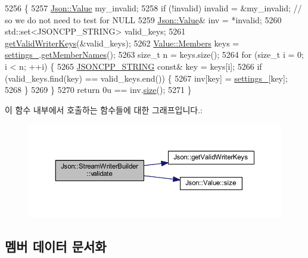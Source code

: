 \begin{DoxyCode}
5256 \{
5257   \hyperlink{class_json_1_1_value}{Json::Value} my\_invalid;
5258   \textcolor{keywordflow}{if} (!invalid) invalid = &my\_invalid;  \textcolor{comment}{// so we do not need to test for NULL}
5259   \hyperlink{class_json_1_1_value}{Json::Value}& inv = *invalid;
5260   std::set<JSONCPP\_STRING> valid\_keys;
5261   \hyperlink{namespace_json_a77ffcc6bb405332d84c260d304d4384e}{getValidWriterKeys}(&valid\_keys);
5262   \hyperlink{class_json_1_1_value_a9ae9069983fc38f1928d76f9c79ac64d}{Value::Members} keys = \hyperlink{class_json_1_1_stream_writer_builder_a79bdf2e639a52f4e758c0b95bd1d3423}{settings\_}.\hyperlink{class_json_1_1_value_a79d7725dce6260317333e69022367ac9}{getMemberNames}();
5263   \textcolor{keywordtype}{size\_t} n = keys.size();
5264   \textcolor{keywordflow}{for} (\textcolor{keywordtype}{size\_t} i = 0; i < n; ++i) \{
5265     \hyperlink{json-forwards_8h_a1e723f95759de062585bc4a8fd3fa4be}{JSONCPP\_STRING} \textcolor{keyword}{const}& key = keys[i];
5266     \textcolor{keywordflow}{if} (valid\_keys.find(key) == valid\_keys.end()) \{
5267       inv[key] = \hyperlink{class_json_1_1_stream_writer_builder_a79bdf2e639a52f4e758c0b95bd1d3423}{settings\_}[key];
5268     \}
5269   \}
5270   \textcolor{keywordflow}{return} 0u == inv.\hyperlink{class_json_1_1_value_a0ec2808e1d7efa4e9fad938d6667be44}{size}();
5271 \}
\end{DoxyCode}
이 함수 내부에서 호출하는 함수들에 대한 그래프입니다.\+:
\nopagebreak
\begin{figure}[H]
\begin{center}
\leavevmode
\includegraphics[width=350pt]{class_json_1_1_stream_writer_builder_a12353b97766841db7d049da84658da09_cgraph}
\end{center}
\end{figure}


\subsection{멤버 데이터 문서화}
\mbox{\label{class_json_1_1_stream_writer_builder_a79bdf2e639a52f4e758c0b95bd1d3423}} 
